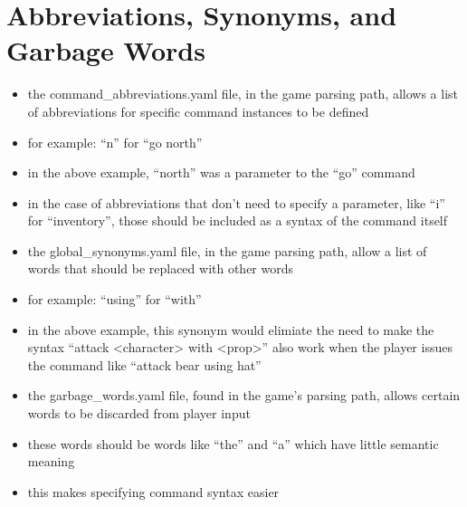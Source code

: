 \documentclass[letterpaper,10pt,english]{manual}
\begin{document}
\section{Abbreviations, Synonyms, and Garbage Words}
\begin{itemize}
\item {} 
the command\_abbreviations.yaml file, in the game parsing path, allows a list of abbreviations for specific command instances to be defined

\item {} 
for example: ``n'' for ``go north''

\item {} 
in the above example, ``north'' was a parameter to the ``go'' command

\item {} 
in the case of abbreviations that don't need to specify a parameter, like ``i'' for ``inventory'', those should be included as a syntax of the command itself

\item {} 
the global\_synonyms.yaml file, in the game parsing path, allow a list of words that should be replaced with other words

\item {} 
for example: ``using'' for ``with''

\item {} 
in the above example, this synonym would elimiate the need to make the syntax ``attack \textless{}character\textgreater{} with \textless{}prop\textgreater{}'' also work when the player issues the command like ``attack bear using hat''

\item {} 
the garbage\_words.yaml file, found in the game's parsing path, allows certain words to be discarded from player input

\item {} 
these words should be words like ``the'' and ``a'' which have little semantic meaning

\item {} 
this makes specifying command syntax easier

\end{itemize}
\end{document}

